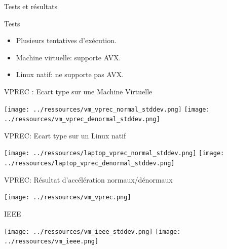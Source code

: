 \documentclass{beamer}
\begin{document}
\begin{frame}{Tests et résultats}

  \begin{block}{Tests}
    
    \begin{itemize}

    \item Plusieurs tentatives d'exécution.
    \item Machine virtuelle: supporte AVX.
    \item Linux natif: ne supporte pas AVX.
      
      
    \end{itemize}
  \end{block}

\end{frame}

\begin{frame}{VPREC : Ecart type sur une Machine Virtuelle}
  
  \centering\texttt{[image: ../ressources/vm\_vprec\_normal\_stddev.png]}
  \centering\texttt{[image: ../ressources/vm\_vprec\_denormal\_stddev.png]}
  
\end{frame}

\begin{frame}{VPREC: Ecart type sur un Linux natif}

  \centering\texttt{[image: ../ressources/laptop\_vprec\_normal\_stddev.png]}
  \centering\texttt{[image: ../ressources/laptop\_vprec\_denormal\_stddev.png]}
  
\end{frame}

\begin{frame}{VPREC: Résultat d'accélération normaux/dénormaux}

  \centering\texttt{[image: ../ressources/vm\_vprec.png]}
  
\end{frame}

\begin{frame}{IEEE}

  \centering\texttt{[image: ../ressources/vm\_ieee\_stddev.png]}
  \centering\texttt{[image: ../ressources/vm\_ieee.png]}
  
\end{frame}
\end{document}
